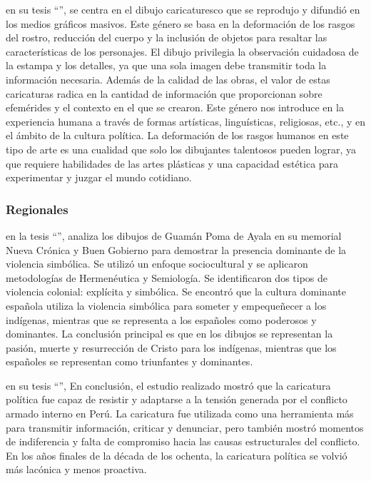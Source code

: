 \documentclass[12pt,a4paper]{article}
\begin{document}
\cite{munoz_caricatura_2005} en su tesis ``'', se centra en el dibujo caricaturesco que se reprodujo y difundió en los medios gráficos masivos. Este género se basa en la deformación de los rasgos del rostro, reducción del cuerpo y la inclusión de objetos para resaltar las características de los personajes. El dibujo privilegia la observación cuidadosa de la estampa y los detalles, ya que una sola imagen debe transmitir toda la información necesaria. Además de la calidad de las obras, el valor de estas caricaturas radica en la cantidad de información que proporcionan sobre efemérides y el contexto en el que se crearon. Este género nos introduce en la experiencia humana a través de formas artísticas, linguísticas, religiosas, etc., y en el ámbito de la cultura política. La deformación de los rasgos humanos en este tipo de arte es una cualidad que solo los dibujantes talentosos pueden lograr, ya que requiere habilidades de las artes plásticas y una capacidad estética para experimentar y juzgar el mundo cotidiano.

\subsubsection{Regionales}
\cite{berrocal_vivanco_representacion_2015} en la tesis ``'', analiza los dibujos de Guamán Poma de Ayala en su memorial Nueva Crónica y Buen Gobierno para demostrar la presencia dominante de la violencia simbólica. Se utilizó un enfoque sociocultural y se aplicaron metodologías de Hermenéutica y Semiología. Se identificaron dos tipos de violencia colonial: explícita y simbólica. Se encontró que la cultura dominante española utiliza la violencia simbólica para someter y empequeñecer a los indígenas, mientras que se representa a los españoles como poderosos y dominantes. La conclusión principal es que en los dibujos se representan la pasión, muerte y resurrección de Cristo para los indígenas, mientras que los españoles se representan como triunfantes y dominantes.

\cite{yupanqui_flujos_2019} en su tesis ``'', En conclusión, el estudio realizado mostró que la caricatura política fue capaz de resistir y adaptarse a la tensión generada por el conflicto armado interno en Perú. La caricatura fue utilizada como una herramienta más para transmitir información, criticar y denunciar, pero también mostró momentos de indiferencia y falta de compromiso hacia las causas estructurales del conflicto. En los años finales de la década de los ochenta, la caricatura política se volvió más lacónica y menos proactiva.
\end{document}
